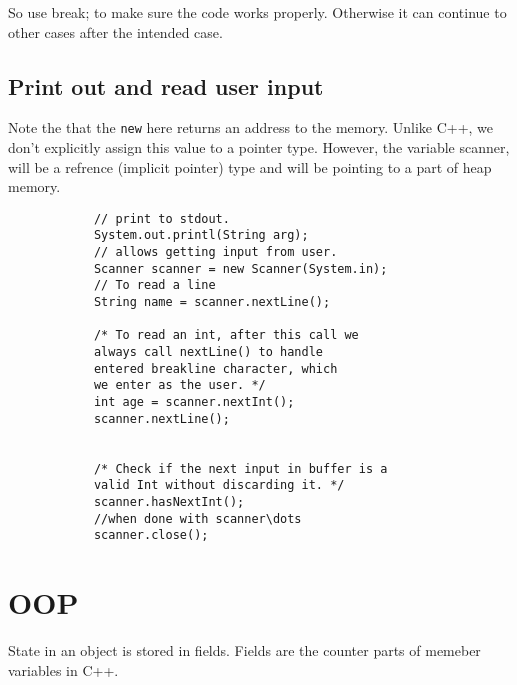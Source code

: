 \documentclass[11pt,twoside,a4paper]{report}
\begin{document}
So use break; to make sure the code works properly. Otherwise it can continue to other cases after the intended case.

\section{Print out and read user input}
Note the that the \verb|new| here returns an address to the memory. Unlike C++, we don't explicitly assign this value to a pointer type.
However, the variable scanner, will be a refrence (implicit pointer) type and will be pointing to a part of heap memory.
\begin{lstlisting}
            // print to stdout.
            System.out.printl(String arg);
            // allows getting input from user.
            Scanner scanner = new Scanner(System.in);
            // To read a line
            String name = scanner.nextLine();

            /* To read an int, after this call we 
            always call nextLine() to handle 
            entered breakline character, which 
            we enter as the user. */
            int age = scanner.nextInt();
            scanner.nextLine();
            

            /* Check if the next input in buffer is a 
            valid Int without discarding it. */
            scanner.hasNextInt();
            //when done with scanner\dots
            scanner.close();
            \end{lstlisting}

\chapter{OOP}
State in an object is stored in fields. Fields are the counter parts of memeber variables in C++.
\end{document}
